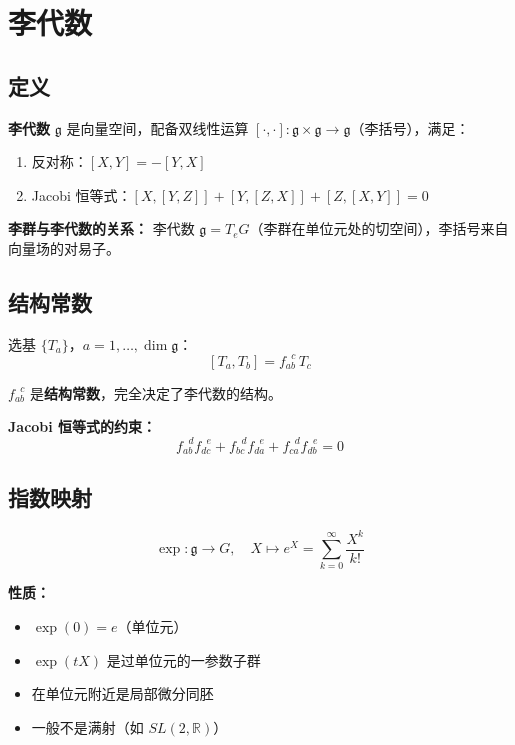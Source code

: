 \section{李代数}
\label{sec:lie-algebra}

\subsection{定义}

\textbf{李代数} $\mathfrak{g}$ 是向量空间，配备双线性运算 $[\cdot,\cdot]: \mathfrak{g} \times \mathfrak{g} \to \mathfrak{g}$（李括号），满足：
\begin{enumerate}
  \item 反对称：$[X, Y] = -[Y, X]$
  \item Jacobi 恒等式：$[X, [Y, Z]] + [Y, [Z, X]] + [Z, [X, Y]] = 0$
\end{enumerate}

\textbf{李群与李代数的关系：} 李代数 $\mathfrak{g} = T_e G$（李群在单位元处的切空间），李括号来自向量场的对易子。

\subsection{结构常数}

选基 $\{T_a\}$，$a = 1, \ldots, \dim\mathfrak{g}$：
\[
[T_a, T_b] = f_{ab}^{\;\;c}\, T_c
\]

$f_{ab}^{\;\;c}$ 是\textbf{结构常数}，完全决定了李代数的结构。

\textbf{Jacobi 恒等式的约束：}
\[
f_{ab}^{\;\;d}f_{dc}^{\;\;e} + f_{bc}^{\;\;d}f_{da}^{\;\;e} + f_{ca}^{\;\;d}f_{db}^{\;\;e} = 0
\]

\subsection{指数映射}

\[
\exp: \mathfrak{g} \to G, \quad X \mapsto e^X = \sum_{k=0}^{\infty} \frac{X^k}{k!}
\]

\textbf{性质：}
\begin{itemize}
  \item $\exp(0) = e$（单位元）
  \item $\exp(tX)$ 是过单位元的一参数子群
  \item 在单位元附近是局部微分同胚
  \item 一般不是满射（如 $SL(2,\mathbb{R})$）
\end{itemize}

